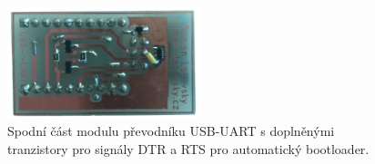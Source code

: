 \begin{figure}[H]
    \centering
    \includegraphics[width=0.5\textwidth]{images/prevodnik-usb-uart-cp2102n/prevodnik-cp2102n-modul-spodni-cast.png}
    \caption[Spodní část modulu převodníku USB-UART.]{Spodní část modulu převodníku USB-UART s doplněnými tranzistory pro signály DTR a RTS pro automatický bootloader.}
    \label{fig:prevodnik-cp2102n-modul-spodni-cast}
\end{figure}
